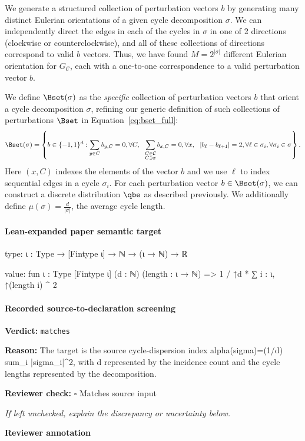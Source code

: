 \documentclass[10pt]{article}
\newcommand{\reviewerbox}{%
  \par\noindent\fbox{\parbox{0.96\linewidth}{\rule{0pt}{0.38in}}}\par
}
\newcommand{\reviewmatch}[1]{%
  \par\noindent\textbf{Reviewer check:} $\square$\; #1\par
  \noindent\emph{If left unchecked, explain the discrepancy or uncertainty below.}\par
}
\begin{document}
\begin{ReviewVerbatim}
	We generate a structured collection of perturbation vectors $b$ by generating many distinct Eulerian orientations of a given cycle decomposition $\sigma$. We can independently direct the edges in each of the	cycles in $\sigma$ in one of 2 directions (clockwise or counterclockwise), and all of these collections of directions correspond to valid $b$ vectors. Thus, we have found $M=2^{|\sigma|}$ different Eulerian orientation for $G_\mathcal{C}$, each with a one-to-one correspondence to a valid perturbation vector $b$.

	We define $\Bset(\sigma)$ as the {\it specific} collection of perturbation vectors $b$ that orient a cycle decomposition $\sigma$, refining our generic definition of such collections of perturbations $\Bset$ in Equation~\eqref{eq:bset_full}:
	\begin{align}
	\label{eq:bset}
	\Bset(\sigma) =
	\left \{
	b \in \lbrace -1, 1 \rbrace^d
	:
	\sum_{y \in C} b_{y,C} = 0, \forall C,
	\ \
	\sum_{\substack{C \in \mathcal{C}\\ C \ni x}} b_{x,C} = 0, \forall x,
	\ \
	|b_\ell - b_{\ell+1} | =2, \forall \ell \in \sigma_i,
	\forall \sigma_i \in \sigma
	\right \}.
	\end{align}
	Here $(x,C)$ indexes the elements of the vector $b$ and we use $\ell$ to index sequential edges in a cycle $\sigma_i$. For each perturbation vector $b \in \Bset(\sigma)$, we can construct a discrete distribution $\qbe$ as described previously. We additionally define $\mu(\sigma) = \frac{d}{|\sigma|}$, the average cycle length.
\end{ReviewVerbatim}



\paragraph{Lean-expanded paper semantic target}
\begin{ReviewVerbatim}
type:
{ι : Type} → [Fintype ι] → ℕ → (ι → ℕ) → ℝ

value:
fun {ι : Type} [Fintype ι] (d : ℕ) (length : ι → ℕ) => 1 / ↑d * ∑ i : ι, ↑(length i) ^ 2
\end{ReviewVerbatim}


\paragraph{Recorded source-to-declaration screening}
\textbf{Verdict:} \texttt{matches}
\\
{\raggedright
\textbf{Reason:} The target is the source cycle-\allowbreak{}dispersion index alpha(sigma)=(1/\allowbreak{}d) sum\_\allowbreak{}i |sigma\_\allowbreak{}i|\textasciicircum{}2, with d represented by the incidence count and the cycle lengths represented by the decomposition.\allowbreak{}
\par}
\reviewmatch{Matches source input}
\noindent\textbf{Reviewer annotation}\par
\reviewerbox
\clearpage
\hypertarget{paper-prerequisite-4cbb8978d5ced12b}{}
\end{document}
